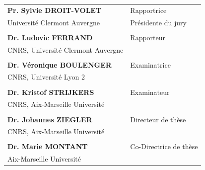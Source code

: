 \begin{center}
\begin{minipage}[t]{.6\linewidth}
	    \vspace{1em}
      \noindent\begin{tabular}{@{}p{16em} p{14em}}
        \textbf{Pr. Sylvie DROIT-VOLET} & Rapportrice\\
      	Université Clermont Auvergne & Présidente du jury\\
        \\
      	\textbf{Dr. Ludovic FERRAND} & Rapporteur\\
      	CNRS, Université Clermont Auvergne\\
        \\
      	\textbf{Dr. Véronique BOULENGER} & Examinatrice\\
      	CNRS, Université Lyon 2\\
      	\\
        \textbf{Dr. Kristof STRIJKERS} & Examinateur\\
      	CNRS, Aix-Marseille Université\\
        \\
      	\textbf{Dr. Johannes ZIEGLER} & Directeur de thèse\\
      	CNRS, Aix-Marseille Université\\
      	\\
      	\textbf{Dr. Marie MONTANT} & Co-Directrice de thèse\\
      	Aix-Marseille Université\\
      \end{tabular}
	\end{minipage}\hfill
\end{center}



